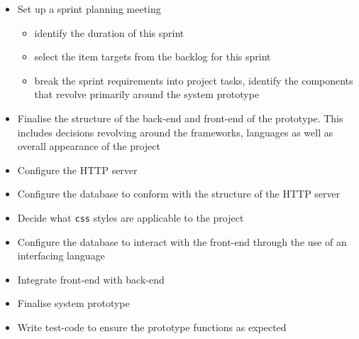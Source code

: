 \documentclass[10pt, a4paper, onecolumn]{scrartcl}
\begin{document}
			\begin{itemize}[noitemsep]
				\item Set up a sprint planning meeting
					\begin{itemize}
						\item identify the duration of this sprint
						\item select the item targets from the backlog for this sprint
						\item break the sprint requirements into project tasks, identify the components that revolve primarily around the system prototype
					\end{itemize}
				\item Finalise the structure of the back-end and front-end of the prototype. This includes decisions revolving around the frameworks, languages as well as overall appearance of the project
				\item Configure the HTTP server
				\item Configure the database to conform with the structure of the HTTP server
				\item Decide what \texttt{css} styles are applicable to the project
				\item Configure the database to interact with the front-end through the use of an interfacing language
				\item Integrate front-end with back-end
				\item Finalise system prototype
				\item Write test-code to ensure the prototype functions as expected
			

\end{itemize}
\end{document}
